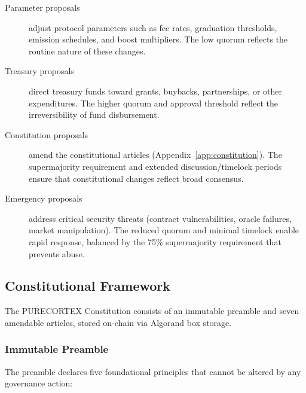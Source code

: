\begin{description}
  \item[Parameter proposals] adjust protocol parameters such as fee rates,
    graduation thresholds, emission schedules, and boost multipliers. The low
    quorum reflects the routine nature of these changes.

  \item[Treasury proposals] direct treasury funds toward grants, buybacks,
    partnerships, or other expenditures. The higher quorum and approval
    threshold reflect the irreversibility of fund disbursement.

  \item[Constitution proposals] amend the constitutional articles
    (Appendix~\ref{app:constitution}). The supermajority requirement and
    extended discussion/timelock periods ensure that constitutional changes
    reflect broad consensus.

  \item[Emergency proposals] address critical security threats (contract
    vulnerabilities, oracle failures, market manipulation). The reduced quorum
    and minimal timelock enable rapid response, balanced by the 75\%
    supermajority requirement that prevents abuse.
\end{description}

\subsection{Constitutional Framework}
\label{subsec:constitution}

The PURECORTEX Constitution consists of an immutable preamble and seven
amendable articles, stored on-chain via Algorand box storage.

\subsubsection{Immutable Preamble}

The preamble declares five foundational principles that cannot be altered by
any governance action:

